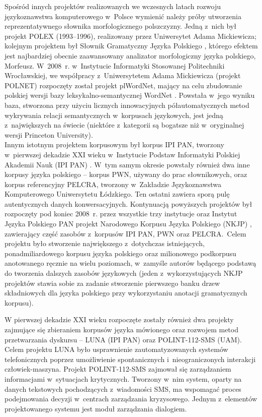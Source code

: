 \begin{multicols}{2}
Spośród innych projektów realizowanych we wczesnych latach rozwoju
językoznawstwa komputerowego w~Polsce wymienić należy próby
utworzenia reprezentatywnego słownika morfologicznego polszczyzny.
Jedną z~nich był projekt POLEX (1993--1996), realizowany przez
Uniwersytet Adama Mickiewicza; kolejnym projektem był Słownik
Gramatyczny Języka Polskiego \cite{SGJP}, którego efektem jest
najbardziej obecnie zaawansowany analizator morfologiczny języka
polskiego, Morfeusz. W~2008~r. w~Instytucie Informatyki Stosowanej
Politechniki Wrocławskiej, we współpracy z~Uniwersytetem Adama
Mickiewicza (projekt POLNET) rozpoczęty został projekt plWordNet,
mający na celu zbudowanie polskiej wersji bazy
leksykalno-semantycznej WordNet \cite{Slowosiec1, Piasecki2009}.
Powstała w~jego wyniku baza, stworzona przy użyciu licznych
innowacyjnych półautomatycznych metod wykrywania relacji
semantycznych w~korpusach językowych, jest jedną z~największych na
świecie (niektóre z~kategorii są bogatsze niż w~oryginalnej wersji
Princeton University).\\
Innym istotnym projektem korpusowym był korpus IPI PAN, tworzony
w~pierwszej dekadzie XXI wieku w~Instytucie Podstaw Informatyki
Polskiej Akademii Nauk (IPI PAN) \cite{korpus1}. W~tym samym okresie
powstały również dwa inne korpusy języka polskiego – korpus PWN,
używany do prac słownikowych, oraz korpus referencyjny PELCRA,
tworzony w~Zakładzie Językoznawstwa Komputerowego Uniwersytetu
Łódzkiego. Ten ostatni zawiera sporą pulę autentycznych danych
konwersacyjnych. Kontynuacją powyższych projektów był rozpoczęty
pod koniec 2008~r. przez wszystkie trzy instytucje oraz Instytut
Języka Polskiego PAN projekt Narodowego Korpusu Języka Polskiego
(NKJP) \cite{nkjp1}, zawierający część zasobów z~korpusów IPI
PAN, PWN oraz PELCRA.~Celem projektu było stworzenie największego
z~dotychczas istniejących, ponadmiliardowego korpusu języka
polskiego oraz milionowego podkorpusu anotowanego ręcznie na wielu
poziomach, w~zamyśle autorów będącego podstawą do tworzenia
dalszych zasobów językowych (jeden z~wykorzystujących NKJP
projektów stawia sobie za zadanie stworzenie pierwszego banku drzew
składniowych dla języka polskiego przy wykorzystaniu anotacji
gramatycznych korpusu). 

W pierwszej dekadzie XXI wieku rozpoczęte zostały również dwa
projekty zajmujące się zbieraniem korpusów języka mówionego oraz
rozwojem metod przetwarzania dyskursu – LUNA (IPI PAN) oraz
POLINT-112-SMS (UAM). Celem projektu LUNA było usprawnienie
zautomatyzowanych systemów telefonicznych poprzez umożliwienie
spontanicznych i~nieograniczonych interakcji człowiek-maszyna.
Projekt POLINT-112-SMS zajmował się zarządzaniem informacjami
w~sytuacjach krytycznych. Tworzony w~nim system, oparty na danych
tekstowych pochodzących z~wiadomości SMS, ma wspomagać proces
podejmowania decyzji w~centrach zarządzania kryzysowego. Jednym
z~elementów projektowanego systemu jest moduł zarządzania
dialogiem. 


\end{multicols}
